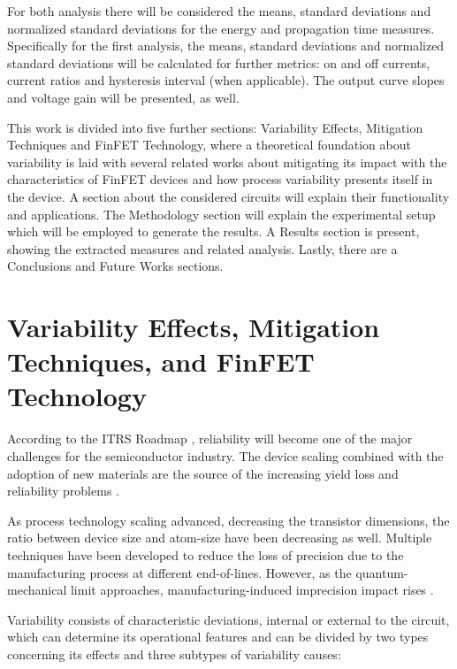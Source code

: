 \documentclass[pgmicro,mestrado,english]{iiufrgs}
\begin{document}
For both analysis there will be considered the means, standard deviations and normalized standard deviations for the energy and propagation time measures. Specifically for the first analysis, the means, standard deviations and normalized standard deviations will be calculated for further metrics: on and off currents, current ratios and hysteresis interval (when applicable). The output curve slopes and voltage gain will be presented, as well.

    This work is divided into five further sections: Variability Effects, Mitigation Techniques and FinFET Technology, where a theoretical foundation about variability is laid with several related works about mitigating its impact with the characteristics of FinFET devices and how process variability presents itself in the device. A section about the considered circuits will explain their functionality and applications. The Methodology section will explain the experimental setup which will be employed to generate the results. A Results section is present, showing the extracted measures and related analysis. Lastly, there are a Conclusions and Future Works sections.

\chapter{Variability Effects, Mitigation Techniques, and FinFET Technology}

According to the ITRS Roadmap \cite{blish2003critical}, reliability will become one of the major challenges for the semiconductor industry. The device scaling combined with the adoption of new materials are the source of the increasing yield loss and reliability problems \cite{gielen2008emerging}.

As process technology scaling advanced, decreasing the transistor dimensions, the ratio between device size and atom-size have been decreasing as well. Multiple techniques have been developed to reduce the loss of precision due to the manufacturing process at different end-of-lines. However, as the quantum-mechanical limit approaches, manufacturing-induced imprecision impact rises \cite{asenov1999random}.

Variability consists of characteristic deviations, internal or external to the circuit, which can determine its operational features and can be divided by two types concerning its effects and three subtypes of variability causes:
\end{document}
